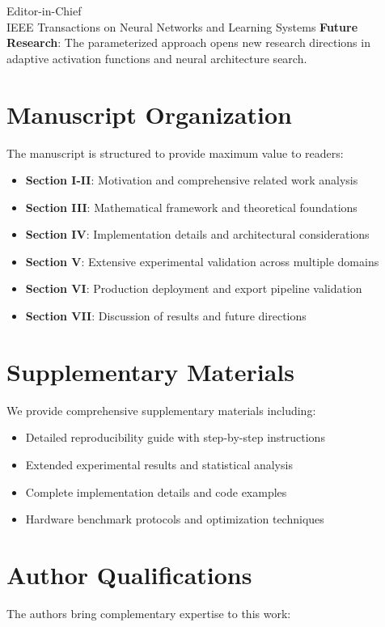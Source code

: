 \documentclass[11pt]{letter}
\begin{document}
\begin{letter}{Editor-in-Chief\\
IEEE Transactions on Neural Networks and Learning Systems}
\textbf{Future Research}: The parameterized approach opens new research directions in adaptive activation functions and neural architecture search.

\section*{Manuscript Organization}

The manuscript is structured to provide maximum value to readers:

\begin{itemize}
    \item \textbf{Section I-II}: Motivation and comprehensive related work analysis
    \item \textbf{Section III}: Mathematical framework and theoretical foundations
    \item \textbf{Section IV}: Implementation details and architectural considerations
    \item \textbf{Section V}: Extensive experimental validation across multiple domains
    \item \textbf{Section VI}: Production deployment and export pipeline validation
    \item \textbf{Section VII}: Discussion of results and future directions
\end{itemize}

\section*{Supplementary Materials}

We provide comprehensive supplementary materials including:

\begin{itemize}
    \item Detailed reproducibility guide with step-by-step instructions
    \item Extended experimental results and statistical analysis
    \item Complete implementation details and code examples
    \item Hardware benchmark protocols and optimization techniques
\end{itemize}

\section*{Author Qualifications}

The authors bring complementary expertise to this work:


\end{letter}
\end{document}
